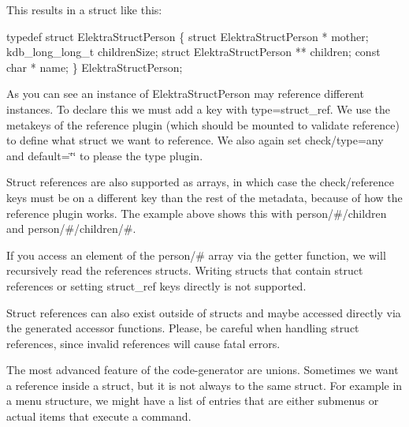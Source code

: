 This results in a struct like this\+:


\begin{DoxyCode}
\textcolor{keyword}{typedef} \textcolor{keyword}{struct }ElektraStructPerson
\{
    \textcolor{keyword}{struct }ElektraStructPerson * mother;
        kdb\_long\_long\_t childrenSize;
        \textcolor{keyword}{struct }ElektraStructPerson ** children;
        \textcolor{keyword}{const} \textcolor{keywordtype}{char} * name;
\} ElektraStructPerson;
\end{DoxyCode}


As you can see an instance of {\ttfamily Elektra\+Struct\+Person} may reference different instances. To declare this we must add a key with {\ttfamily type=struct\+\_\+ref}. We use the metakeys of the {\ttfamily reference} plugin (which should be mounted to validate reference) to define what struct we want to reference. We also again set {\ttfamily check/type=any} and {\ttfamily default=\char`\"{}\char`\"{}} to please the {\ttfamily type} plugin.

Struct references are also supported as arrays, in which case the {\ttfamily check/reference} keys must be on a different key than the rest of the metadata, because of how the {\ttfamily reference} plugin works. The example above shows this with {\ttfamily person/\#/children} and {\ttfamily person/\#/children/\#}.

If you access an element of the {\ttfamily person/\#} array via the getter function, we will recursively read the references structs. Writing structs that contain struct references or setting {\ttfamily struct\+\_\+ref} keys directly is not supported.

Struct references can also exist outside of structs and maybe accessed directly via the generated accessor functions. Please, be careful when handling struct references, since invalid references will cause fatal errors.

The most advanced feature of the code-\/generator are unions. Sometimes we want a reference inside a struct, but it is not always to the same struct. For example in a menu structure, we might have a list of entries that are either submenus or actual items that execute a command.


